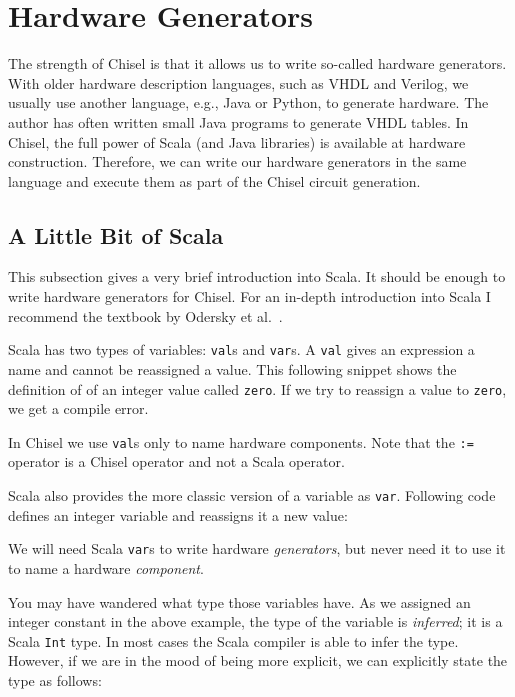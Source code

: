 \documentclass[%
    10pt,
    headinclude, footexclude,
    openright, %
    notitlepage,
    cleardoubleempty,
    headsepline,
    pointlessnumbers,
    bibtotoc, idxtotoc,
    ]{scrbook}
\newcommand{\code}[1]{{\small{\texttt{#1}}}}
\begin{document}
\chapter{Hardware Generators}

The strength of Chisel is that it allows us to write so-called hardware generators.
With older hardware description languages, such as VHDL and Verilog,
we usually use another language, e.g., Java or Python, to generate hardware.
The author has often written small Java programs to generate VHDL tables.
In Chisel, the full power of Scala (and Java libraries) is available at hardware
construction. Therefore, we can write our hardware generators in the same
language and execute them as part of the Chisel circuit generation.

\section{A Little Bit of Scala}

This subsection gives a very brief introduction into Scala. It should be enough
to write hardware generators for Chisel.
For an in-depth introduction into Scala I recommend the textbook by Odersky et al.~\cite{Scala}.

Scala has two types of variables: \code{val}s and \code{var}s. A \code{val} gives an expression
a name and cannot be reassigned a value. This following snippet shows the definition of
of an integer value called \code{zero}. If we try to reassign a value to \code{zero}, we get
a compile error.


\noindent In Chisel we use \code{val}s only to name hardware components. Note that the \code{:=}
operator is a Chisel operator and not a Scala operator.

Scala also provides the more classic version of a variable as \code{var}. Following code defines
an integer variable and reassigns it a new value:


\noindent We will need Scala \code{var}s to write hardware \emph{generators}, but never need
it to use it to name a hardware \emph{component}.

You may have wandered what type those variables have. As we assigned an integer constant
in the above example, the type of the variable is \emph{inferred}; it is a Scala \code{Int} type.
In most cases the Scala compiler is able to infer the type. However, if we are in the mood of
being more explicit, we can explicitly state the type as follows:
\end{document}
